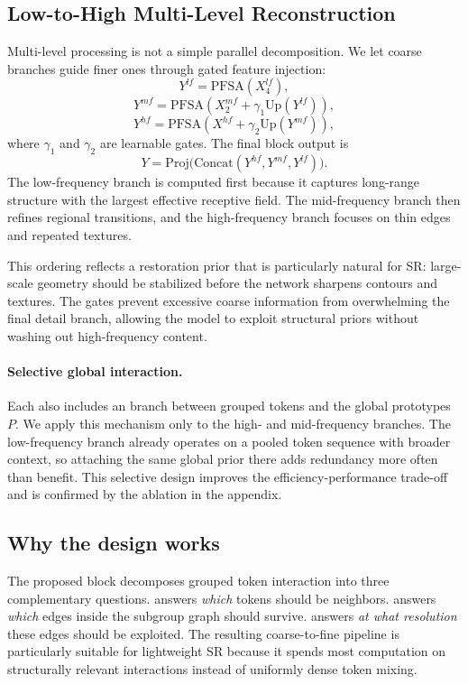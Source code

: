 \subsection{Low-to-High Multi-Level Reconstruction}
Multi-level processing is not a simple parallel decomposition. We let coarse branches guide finer ones through gated feature injection:
\begin{equation}
Y^{lf} = \mathrm{PFSA}(X^{lf}_4),
\end{equation}
\begin{equation}
Y^{mf} = \mathrm{PFSA}(X^{mf}_2 + \gamma_1 \mathrm{Up}(Y^{lf})),
\end{equation}
\begin{equation}
Y^{hf} = \mathrm{PFSA}(X^{hf} + \gamma_2 \mathrm{Up}(Y^{mf})),
\end{equation}
where \(\gamma_1\) and \(\gamma_2\) are learnable gates. The final block output is
\begin{equation}
Y = \mathrm{Proj}\bigl(\mathrm{Concat}(Y^{hf}, Y^{mf}, Y^{lf})\bigr).
\end{equation}
The low-frequency branch is computed first because it captures long-range structure with the largest effective receptive field. The mid-frequency branch then refines regional transitions, and the high-frequency branch focuses on thin edges and repeated textures.

This ordering reflects a restoration prior that is particularly natural for SR: large-scale geometry should be stabilized before the network sharpens contours and textures. The gates prevent excessive coarse information from overwhelming the final detail branch, allowing the model to exploit structural priors without washing out high-frequency content.

\paragraph{Selective global interaction.}
Each \moduleName{} also includes an \irca{} branch between grouped tokens and the global prototypes \(P\). We apply this mechanism only to the high- and mid-frequency branches. The low-frequency branch already operates on a pooled token sequence with broader context, so attaching the same global prior there adds redundancy more often than benefit. This selective design improves the efficiency-performance trade-off and is confirmed by the ablation in the appendix.

\subsection{Why the design works}
The proposed block decomposes grouped token interaction into three complementary questions. \dpr{} answers \emph{which} tokens should be neighbors. \pfsa{} answers \emph{which} edges inside the subgroup graph should survive. \lmr{} answers \emph{at what resolution} these edges should be exploited. The resulting coarse-to-fine pipeline is particularly suitable for lightweight SR because it spends most computation on structurally relevant interactions instead of uniformly dense token mixing.
